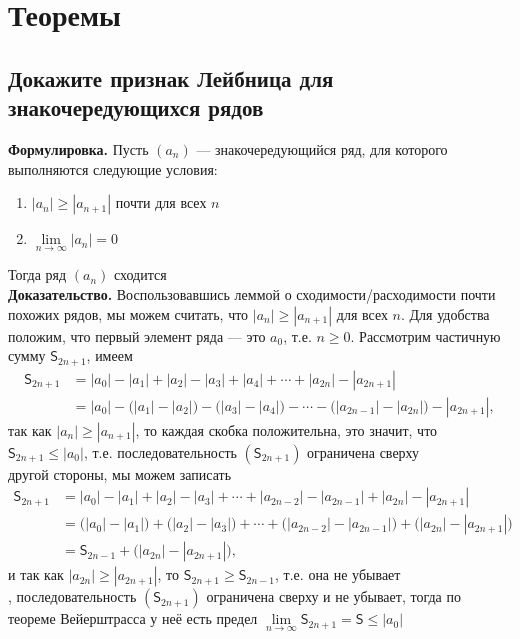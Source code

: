 \documentclass[a4paper]{article}
\begin{document}
\newpage
\section{Теоремы}
\subsection{Докажите признак Лейбница для знакочередующихся рядов}
\textbf{Формулировка.} Пусть $(a_n)$ — знакочередующийся ряд, для которого выполняются следующие условия:
\begin{enumerate}
    \item $|a_n| \geqslant |a_{n+1}|$ почти для всех $n$
    \item $\lim\limits_{n \to \infty} |a_n| = 0$
\end{enumerate}
Тогда ряд $(a_n)$ сходится\\[4mm]
\indent\textbf{Доказательство.} Воспользовавшись леммой о сходимости/расходимости почти похожих рядов, мы можем считать, что $|a_n| \geqslant |a_{n+1}|$ для всех $n$. Для удобства положим, что первый элемент ряда — это $a_0$, т.е. $n \geqslant 0$. Рассмотрим частичную сумму $\mathsf{S}_{2n+1}$, имеем
$$\begin{aligned}
\mathsf{S}_{2n+1} &= |a_0| - |a_1| + |a_2| - |a_3| + |a_4| + \cdots  + |a_{2n}| - |a_{2n+1}| \\
&= |a_0| - \bigl(|a_1| - |a_2|\bigr) - \bigl(|a_3| - |a_4|\bigr) - \cdots - \bigl(|a_{2n-1}|-  |a_{2n}|\bigr) - |a_{2n+1}|,
\end{aligned}$$
так как $|a_n| \geqslant |a_{n+1}|$, то каждая скобка положительна, это значит, что $\mathsf{S}_{2n+1} \leqslant |a_0|$, т.е. последовательность $(\mathsf{S}_{2n+1})$ ограничена сверху\\[2mm]
 другой стороны, мы можем записать
$$\begin{aligned}
\mathsf{S}_{2n+1} &= |a_0| - |a_1| + |a_2| - |a_3| + \cdots  + |a_{2n-2}| - |a_{2n-1}| + |a_{2n}| - |a_{2n+1}| \\
&= \bigl(|a_0| - |a_1| \bigr) + \bigl(|a_2|-|a_3| \bigr) + \cdots + \bigl( |a_{2n-2}| - |a_{2n-1}|\bigr)+ \bigl(|a_{2n}| - |a_{2n+1}|\bigr) \\
&= \mathsf{S}_{2n-1} + \bigl(|a_{2n}| - |a_{2n+1}|\bigr),
\end{aligned}$$
и так как $|a_{2n}| \geqslant |a_{2n+1}|$, то $\mathsf{S}_{2n+1} \geqslant \mathsf{S}_{2n-1}$, т.е. она не убывает\\[2mm]
, последовательность $\left(\mathsf{S}_{2n+1}\right)$ ограничена сверху и не убывает, тогда по теореме Вейерштрасса у неё есть предел $\lim\limits_{n \to \infty}\mathsf{S}_{2n+1} = \mathsf{S} \leqslant |a_0|$\\[2mm]
\end{document}
